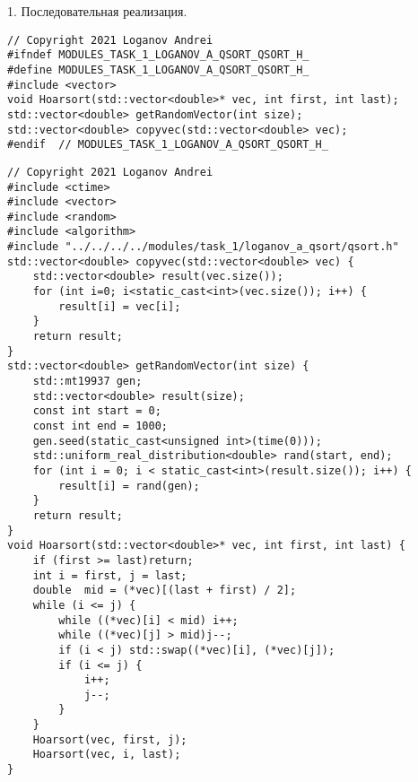 \documentclass{report}
\begin{document}
\par 1. Последовательная реализация.
\begin{lstlisting}
// Copyright 2021 Loganov Andrei
#ifndef MODULES_TASK_1_LOGANOV_A_QSORT_QSORT_H_
#define MODULES_TASK_1_LOGANOV_A_QSORT_QSORT_H_
#include <vector>
void Hoarsort(std::vector<double>* vec, int first, int last);
std::vector<double> getRandomVector(int size);
std::vector<double> copyvec(std::vector<double> vec);
#endif  // MODULES_TASK_1_LOGANOV_A_QSORT_QSORT_H_

\end{lstlisting}
\begin{lstlisting}
// Copyright 2021 Loganov Andrei
#include <ctime>
#include <vector>
#include <random>
#include <algorithm>
#include "../../../../modules/task_1/loganov_a_qsort/qsort.h"
std::vector<double> copyvec(std::vector<double> vec) {
    std::vector<double> result(vec.size());
    for (int i=0; i<static_cast<int>(vec.size()); i++) {
        result[i] = vec[i];
    }
    return result;
}
std::vector<double> getRandomVector(int size) {
    std::mt19937 gen;
    std::vector<double> result(size);
    const int start = 0;
    const int end = 1000;
    gen.seed(static_cast<unsigned int>(time(0)));
    std::uniform_real_distribution<double> rand(start, end);
    for (int i = 0; i < static_cast<int>(result.size()); i++) {
        result[i] = rand(gen);
    }
    return result;
}
void Hoarsort(std::vector<double>* vec, int first, int last) {
    if (first >= last)return;
    int i = first, j = last;
    double  mid = (*vec)[(last + first) / 2];
    while (i <= j) {
        while ((*vec)[i] < mid) i++;
        while ((*vec)[j] > mid)j--;
        if (i < j) std::swap((*vec)[i], (*vec)[j]);
        if (i <= j) {
            i++;
            j--;
        }
    }
    Hoarsort(vec, first, j);
    Hoarsort(vec, i, last);
}


\end{lstlisting}
\end{document}
